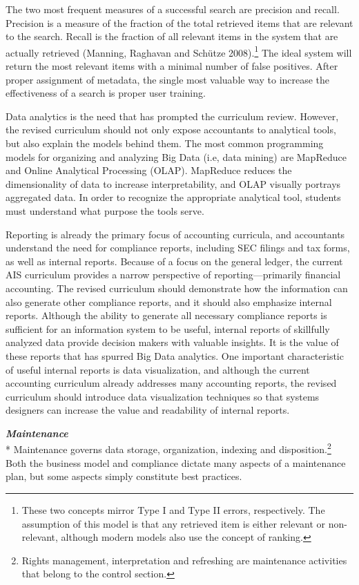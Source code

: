 \documentclass[12pt]{article}
\newcommand{\SubSubSection}[1]{{\centering{}\normalsize{}\textbf{\emph{#1}}}\\*\indent{}}
\begin{document}
The two most frequent measures of a successful search are precision and recall. Precision is a measure of the fraction of the total retrieved items that are relevant to the search. Recall is the fraction of all relevant items in the system that are actually retrieved (Manning, Raghavan and Sch\"utze 2008).\footnote{These two concepts mirror Type I and Type II errors, respectively. The assumption of this model is that any retrieved item is either relevant or non-relevant, although modern models also use the concept of ranking.} The ideal system will return the most relevant items with a minimal number of false positives. After proper assignment of metadata, the single most valuable way to increase the effectiveness of a search is proper user training.

Data analytics is the need that has prompted the curriculum review. However, the revised curriculum should not only expose accountants to analytical tools, but also explain the models behind them. The most common programming models for organizing and analyzing Big Data (i.e, data mining) are MapReduce and Online Analytical Processing (OLAP). MapReduce reduces the dimensionality of data to increase interpretability, and OLAP visually portrays aggregated data. In order to recognize the appropriate analytical tool, students must understand what purpose the tools serve.

Reporting is already the primary focus of accounting curricula, and accountants understand the need for compliance reports, including SEC filings and tax forms, as well as internal reports. Because of a focus on the general ledger, the current AIS curriculum provides a narrow perspective of reporting---primarily financial accounting.  The revised curriculum should demonstrate how the information can also generate other compliance reports, and it should also emphasize internal reports. Although the ability to generate all necessary compliance reports is sufficient for an information system to be useful, internal reports of skillfully analyzed data provide decision makers with valuable insights. It is the value of these reports that has spurred Big Data analytics. One important characteristic of useful internal reports is data visualization, and although the current accounting curriculum already addresses many accounting reports, the revised curriculum should introduce data visualization techniques so that systems designers can increase the value and readability of internal reports.

\SubSubSection{Maintenance}
Maintenance governs data storage, organization, indexing and disposition.\footnote{Rights management, interpretation and refreshing are maintenance activities that belong to the control section.} Both the business model and compliance dictate many aspects of a maintenance plan, but some aspects simply constitute best practices.
\end{document}
